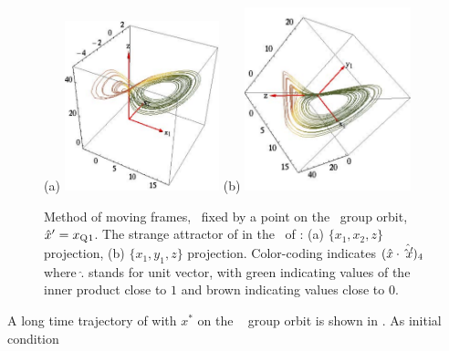 {\begin{example}
%
\begin{figure}[ht]
\begin{center}
(a) \includegraphics[width=0.40\textwidth]{../figs/CLEpcSect}
(b) \includegraphics[width=0.43\textwidth]{../figs/CLEpcSect2}
\end{center}
\caption{
Method of moving frames, \slice\ fixed by a point on the
\reqv\ group orbit, ${\hat{x}'}  = x_{\mathrm{Q}_{}1}$. The strange
attractor of  in the \reducedsp\
of :
(a) $\{x_1,x_2,z\}$ projection,
(b) $\{x_1,y_1,z\}$ projection.
Color-coding indicates $(\hat{x} \cdot \hat{{\hat{x}'} })_4$
where $\hat{.}$ stands for unit vector, with green indicating values
of the inner product close to $1$ and brown indicating values
close to $0$.
    }
\label{fig:CLEpcSect}
\end{figure}
%
A long time trajectory of  with
$x^*$ on the \reqv\  group orbit is shown in
.
As initial condition

\end{example}}

